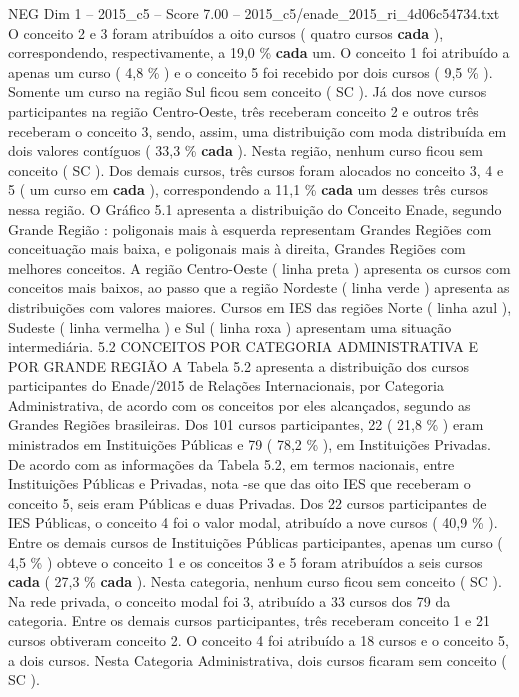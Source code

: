 \begin{textsample}{NEG Dim 1 – 2015\_c5 – Score 7.00 – 2015\_c5/enade\_2015\_ri\_4d06c54734.txt}
O conceito 2 e 3 foram atribuídos a oito cursos ( quatro cursos \textbf{cada} ), correspondendo, respectivamente, a 19,0 \% \textbf{cada} um.
O conceito 1 foi atribuído a apenas um curso ( 4,8 \% ) e o conceito 5 foi recebido por dois cursos ( 9,5 \% ).
Somente um curso na região Sul ficou sem conceito ( SC ).
Já dos nove cursos participantes na região Centro-Oeste, três receberam conceito 2 e outros três receberam o conceito 3, sendo, assim, uma distribuição com moda distribuída em dois valores contíguos ( 33,3 \% \textbf{cada} ).
Nesta região, nenhum curso ficou sem conceito ( SC ).
Dos demais cursos, três cursos foram alocados no conceito 3, 4 e 5 ( um curso em \textbf{cada} ), correspondendo a 11,1 \% \textbf{cada} um desses três cursos nessa região.
O Gráfico 5.1 apresenta a distribuição do Conceito Enade, segundo Grande Região : poligonais mais à esquerda representam Grandes Regiões com conceituação mais baixa, e poligonais mais à direita, Grandes Regiões com melhores conceitos.
A região Centro-Oeste ( linha preta ) apresenta os cursos com conceitos mais baixos, ao passo que a região Nordeste ( linha verde ) apresenta as distribuições com valores maiores.
Cursos em IES das regiões Norte ( linha azul ), Sudeste ( linha vermelha ) e Sul ( linha roxa ) apresentam uma situação intermediária. 5.2 CONCEITOS POR CATEGORIA ADMINISTRATIVA E POR GRANDE REGIÃO A Tabela 5.2 apresenta a distribuição dos cursos participantes do Enade/2015 de Relações Internacionais, por Categoria Administrativa, de acordo com os conceitos por eles alcançados, segundo as Grandes Regiões brasileiras.
Dos 101 cursos participantes, 22 ( 21,8 \% ) eram ministrados em Instituições Públicas e 79 ( 78,2 \% ), em Instituições Privadas.
De acordo com as informações da Tabela 5.2, em termos nacionais, entre Instituições Públicas e Privadas, nota -se que das oito IES que receberam o conceito 5, seis eram Públicas e duas Privadas.
Dos 22 cursos participantes de IES Públicas, o conceito 4 foi o valor modal, atribuído a nove cursos ( 40,9 \% ).
Entre os demais cursos de Instituições Públicas participantes, apenas um curso ( 4,5 \% ) obteve o conceito 1 e os conceitos 3 e 5 foram atribuídos a seis cursos \textbf{cada} ( 27,3 \% \textbf{cada} ).
Nesta categoria, nenhum curso ficou sem conceito ( SC ).
Na rede privada, o conceito modal foi 3, atribuído a 33 cursos dos 79 da categoria.
Entre os demais cursos participantes, três receberam conceito 1 e 21 cursos obtiveram conceito 2.
O conceito 4 foi atribuído a 18 cursos e o conceito 5, a dois cursos.
Nesta Categoria Administrativa, dois cursos ficaram sem conceito ( SC ).

\end{textsample}
